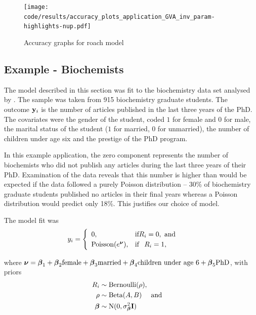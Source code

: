 \begin{figure}[h]
	\centering
	\texttt{[image: code/results/accuracy\_plots\_application\_GVA\_inv\_param-highlights-nup.pdf]}
	\caption{Accuracy graphs for roach model}
	\label{fig:accuracy_roach}
\end{figure}
		
\subsection{Example - Biochemists}
\label{sec:biochemists}

The model described in this section was fit to the biochemistry data set
analysed by \cite{Long1990}. The sample was taken from 915 biochemistry
graduate students. The outcome ${\bf y}_i$ is the number of articles published in
the last three years of the PhD. The covariates were the gender of the student,
coded $1$ for female and $0$ for male, the marital status of the student ($1$
for married, $0$ for unmarried), the number of children under age six and the
prestige of the PhD program.

In this example application, the zero component represents the number of
biochemists who did not publish any articles during the last three years of
their PhD. Examination of the data reveals that this number is higher than
would be expected if the data followed a purely Poisson distribution -- 30\% of
biochemistry graduate students published no articles in their final years
whereas a Poisson distribution would predict only 18\%. This justifies our
choice of model.

The model fit was
$$
	y_i = \begin{cases}
	\begin{array}{ll}
	0, & \text{if} R_i = 0, \text{ and }\\
	\text{Poisson}(e^{\boldsymbol \nu}), & \text{if} \phantom{-} R_i = 1,
	\end{array}
	\end{cases}
$$

\noindent where ${\boldsymbol \nu} = {\boldsymbol \beta}_1 + {\boldsymbol \beta}_2 \text{female} + {\boldsymbol \beta}_3
\text{married} + {\boldsymbol \beta}_4 \text{children under age 6} + {\boldsymbol \beta}_5 \text{PhD}$,
with priors
\begin{align*}
R_i &\sim \text{Bernoulli}(\rho), \\
\rho &\sim \text{Beta}(A, B) \quad \text{ and } \\
{\boldsymbol \beta} &\sim \text{N}(0, \sigma_{\boldsymbol \beta}^2 {\bf I})
\end{align*}

